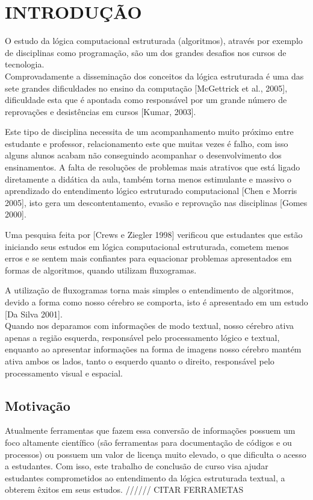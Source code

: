 \chapter{INTRODUÇÃO}
O estudo da lógica computacional estruturada (algoritmos), através por exemplo de disciplinas como programação, são um dos grandes desafios nos cursos de tecnologia. \\
Comprovadamente a disseminação dos conceitos da lógica estruturada é uma das sete grandes dificuldades no ensino da computação [McGettrick et al., 2005], dificuldade esta que é apontada como responsável por um grande número de reprovações e desistências em cursos [Kumar, 2003].\par

Este tipo de disciplina necessita de um acompanhamento muito próximo entre estudante e professor, relacionamento este que muitas vezes é falho, com isso alguns alunos acabam não conseguindo acompanhar o desenvolvimento dos ensinamentos. A falta de resoluções de problemas mais atrativos que está ligado diretamente a didática da aula, também torna menos estimulante e massivo o aprendizado do entendimento lógico estruturado computacional [Chen e Morris 2005], isto gera um descontentamento, evasão e reprovação nas disciplinas [Gomes 2000].\par

Uma pesquisa feita por [Crews e Ziegler 1998] verificou que estudantes que estão iniciando seus estudos em lógica computacional estruturada, cometem menos erros e se sentem mais confiantes para equacionar problemas apresentados em formas de algoritmos, quando utilizam fluxogramas.\par

A utilização de fluxogramas torna mais simples o entendimento de algoritmos, devido a forma como nosso cérebro se comporta, isto é apresentado em um estudo [Da Silva 2001]. \\
Quando nos deparamos com informações de modo textual, nosso cérebro ativa apenas a região esquerda, responsável pelo processamento lógico e textual, enquanto ao apresentar informações na forma de imagens nosso cérebro mantém ativa ambos os lados, tanto o esquerdo quanto o direito,  responsável pelo processamento visual e espacial. \par


\section{Motivação}
Atualmente ferramentas que fazem essa conversão de informações possuem um foco altamente científico (são ferramentas para documentação de códigos e ou processos) ou possuem um valor de licença muito elevado, o que dificulta o acesso a estudantes. Com isso, este trabalho de conclusão de curso visa ajudar  estudantes comprometidos ao entendimento da lógica estruturada textual, a obterem êxitos em seus estudos.
////// CITAR FERRAMETAS
\par
\label{mot}


